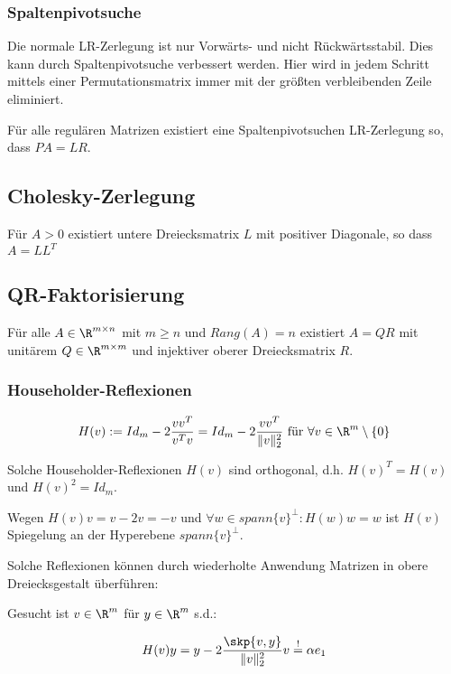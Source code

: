 \subsubsection*{Spaltenpivotsuche}

Die normale LR-Zerlegung ist nur Vorwärts- und nicht Rückwärtsstabil. Dies kann durch Spaltenpivotsuche verbessert werden. Hier wird in jedem Schritt mittels einer Permutationsmatrix immer mit der größten verbleibenden Zeile eliminiert.

\vspace{1mm}

Für alle regulären Matrizen existiert eine Spaltenpivotsuchen LR-Zerlegung so, dass $PA=LR$.

\subsection*{Cholesky-Zerlegung}

Für $A > 0$ existiert untere Dreiecksmatrix $L$ mit positiver Diagonale, so dass $A = LL^T$

\subsection*{QR-Faktorisierung}

Für alle $A \in \R^{m \times n}$ mit $m \geq n$ und $Rang(A)=n$ existiert $A=QR$ mit unitärem $Q \in \R^{m \times m}$ und injektiver oberer Dreiecksmatrix $R$.

\subsubsection*{Householder-Reflexionen}

$$H(v) := Id_m - 2 \frac{vv^T}{v^Tv} = Id_m - 2 \frac{vv^T}{\|v\|_2^2} \text{ für } \forall v \in \R^m \setminus \{0\}$$

Solche Householder-Reflexionen $H(v)$ sind orthogonal, d.h. $H(v)^T=H(v)$ und $H(v)^2=Id_m$.

Wegen $H(v)v=v-2v=-v$ und $\forall w \in spann\{v\}^\perp : H(w)w=w$ ist $H(v)$ Spiegelung an der Hyperebene $spann\{v\}^\perp$.

Solche Reflexionen können durch wiederholte Anwendung Matrizen in obere Dreiecksgestalt überführen:

\vspace{1mm}

Gesucht ist $v \in \R^m$ für $y \in \R^m$ s.d.:

\vspace{-2mm}
$$H(v)y=y - 2 \frac{\skp{v,y}}{\|v\|_2^2}v \overset{!}{=} \alpha e_1$$

